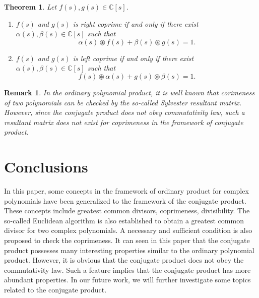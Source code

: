 \documentclass[12pt,a4paper,fleqn,twoside]{article}
\theoremstyle{plain}
\newtheorem{theorem}{Theorem}
\newtheorem{remark}{Remark}
\begin{document}
	\begin{theorem}
		Let $f(s),g(s)\in \mathbb{C}[s].$
		\begin{enumerate}[\normalfont(1)]
			\item $f(s)$ and $g(s)$ is right coprime if and only if there exist $\alpha(s),\beta(s)\in \mathbb{C}[s]$ such that
			\[\alpha(s)\circledast f(s)+\beta(s)\circledast g(s)=1.\]
			\item $f(s)$ and $g(s)$ is left coprime if and only if there exist $\alpha(s),\beta(s)\in \mathbb{C}[s]$ such that
			\[f(s)\circledast \alpha(s)+g(s)\circledast \beta(s)=1.\]
		\end{enumerate}
	\end{theorem}
	\begin{remark}
		\normalfont
		In the ordinary polynomial product, it is well known that corimeness of two polynomials can be checked by the so-called Sylvester resultant matrix. However, since the conjugate product does not obey commutativity law, such a resultant matrix does not exist for coprimeness in the framework of conjugate product.
	\end{remark}
	\section{Conclusions}
	In this paper, some concepts in the framework of ordinary product for complex polynomials have been generalized to the framework of the conjugate product. These concepts include greatest common divisors, coprimeness, divisibility. The so-called Euclidean algorithm is also established to obtain a greatest common divisor for two complex polynomials. A necessary and sufficient condition is also proposed to check the coprimeness. It can seen in this paper that the conjugate product possesses many interesting properties similar to the ordinary polynomial product. However, it is obvious that the conjugate product does not obey the commutativity law. Such a feature implies that the conjugate product has more abundant properties. In our future work, we will further investigate some topics related to the conjugate product. 
\end{document}

